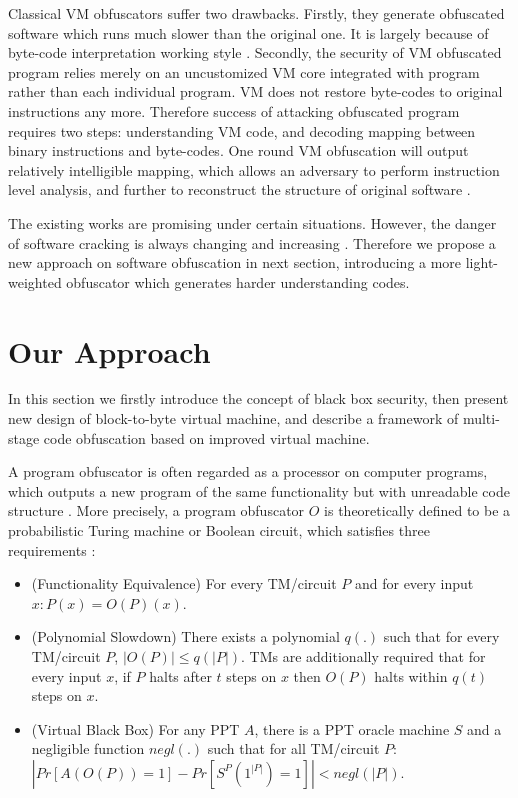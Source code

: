 \documentclass{../style/llncs}                   %
\begin{document}
Classical VM obfuscators suffer two drawbacks.
Firstly, they generate obfuscated software which runs
much slower than the original one. It is largely
because of byte-code interpretation working style \cite{oreans,vmprotect}.
Secondly, the security of VM obfuscated program
relies merely on an uncustomized VM core integrated with program
rather than each individual program.
VM does not restore byte-codes to original
instructions any more.
Therefore success of attacking obfuscated program requires two steps:
understanding VM code, and decoding mapping
between binary instructions and byte-codes.
One round VM obfuscation will output relatively intelligible mapping,
which allows an adversary to perform instruction level
analysis, and further to reconstruct the structure of original
software \cite{sharif09,rolles09}.


The existing works are promising under certain situations.
However, the danger of software cracking is always
changing and increasing \cite{udupa05,madou06b}.
Therefore we propose a new approach on software obfuscation
in next section, introducing a more light-weighted obfuscator
which generates harder understanding codes.



\section{Our Approach} \label{section_approach}


In this section we firstly introduce the concept of black box security,
then present new design of block-to-byte virtual machine,
and describe a framework of multi-stage code obfuscation
based on improved virtual machine.

A program obfuscator is often regarded as a processor on
computer programs, which outputs a new program of the same functionality
but with unreadable code structure \cite{ogiso03,collberg09}.
More precisely, a program obfuscator $O$ is theoretically defined to be
a probabilistic Turing machine or Boolean circuit,
which satisfies three requirements \cite{barak01}:
\begin{itemize}
  \item (Functionality Equivalence) For every TM/circuit $P$ and for every input $x: P(x) = O(P)(x)$.

  \item (Polynomial Slowdown) There exists a polynomial $q(.)$ such that for every TM/circuit $P$, $|O(P)| \le q(|P|)$.
TMs are additionally required that for every input $x$, if $P$ halts after $t$ steps on $x$ then $O(P)$ halts within $q(t)$ steps on $x$.

  \item (Virtual Black Box) For any PPT $A$, there is a PPT oracle machine $S$ and a negligible
   function $negl(.)$ such that for all TM/circuit $P$:
$| Pr[A(O(P))=1] - Pr[S^P(1^{|P|})=1] |  <  negl(|P|)$.

\end{itemize}
\end{document}
